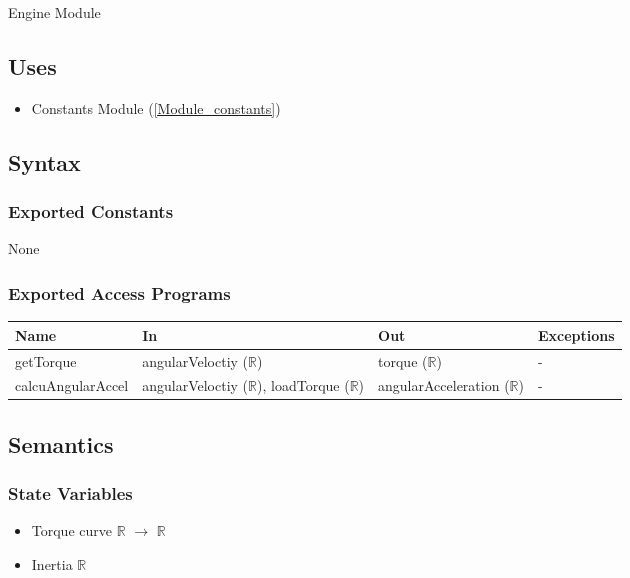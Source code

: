 \documentclass[12pt, titlepage]{article}
\begin{document}
Engine Module

\subsection{Uses}

\begin{itemize}
  \item Constants Module (\ref{Module_constants})
\end{itemize}

\subsection{Syntax}

\subsubsection{Exported Constants}
None

\subsubsection{Exported Access Programs}

\begin{center}
\begin{tabular}{p{4cm} p{4cm} p{4cm} p{2cm}}
\hline
\textbf{Name} & \textbf{In} & \textbf{Out} & \textbf{Exceptions} \\
\hline
getTorque & angularVeloctiy ($\mathbb{R}$) & torque ($\mathbb{R}$) & - \\
calcuAngularAccel & angularVeloctiy ($\mathbb{R}$), loadTorque ($\mathbb{R}$)  & angularAcceleration ($\mathbb{R}$) & - \\
\hline
\end{tabular}
\end{center}

\subsection{Semantics}

\subsubsection{State Variables}

\begin{itemize}
  \item Torque curve $\mathbb{R}$ $\rightarrow$ $\mathbb{R}$
  \item Inertia $\mathbb{R}$
\end{itemize}
\end{document}
